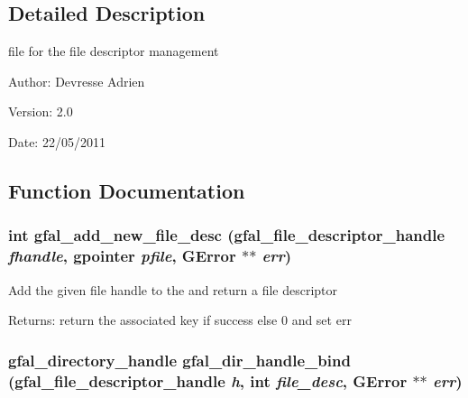 \subsection{Detailed Description}
file for the file descriptor management 

\begin{Desc}
\item[Author:]Devresse Adrien \end{Desc}
\begin{Desc}
\item[Version:]2.0 \end{Desc}
\begin{Desc}
\item[Date:]22/05/2011 \end{Desc}


\subsection{Function Documentation}
\subsubsection{\setlength{\rightskip}{0pt plus 5cm}int gfal\_\-add\_\-new\_\-file\_\-desc (gfal\_\-file\_\-descriptor\_\-handle {\em fhandle}, gpointer {\em pfile}, GError $\ast$$\ast$ {\em err})}\label{gfal__common__filedescriptor_8c_9f4b31ee629162f3ae66a7b82b424910}


Add the given file handle to the and return a file descriptor \begin{Desc}
\item[Returns:]return the associated key if success else 0 and set err \end{Desc}
\subsubsection{\setlength{\rightskip}{0pt plus 5cm}gfal\_\-directory\_\-handle gfal\_\-dir\_\-handle\_\-bind (gfal\_\-file\_\-descriptor\_\-handle {\em h}, int {\em file\_\-desc}, GError $\ast$$\ast$ {\em err})}\label{gfal__common__filedescriptor_8c_23224901d9b8c37c00a8a9fda23f701a}


